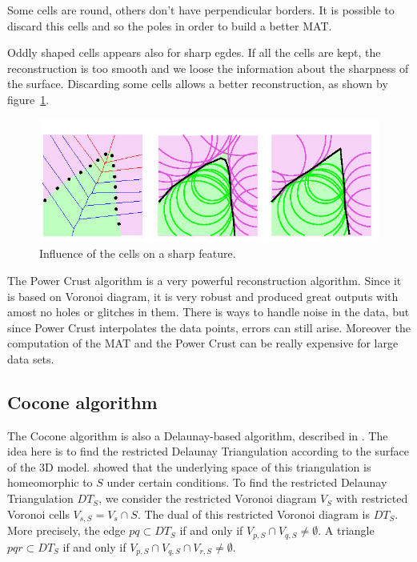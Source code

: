 \documentclass[12pt]{article}
\begin{document}
Some cells are round, others don't have perpendicular borders. It is possible to discard this cells and so the poles in order to build a better MAT. 

Oddly shaped cells appears also for sharp egdes. If all the cells are kept, the reconstruction is too smooth and we loose the information about the sharpness of the surface. Discarding some cells allows a better reconstruction, as shown by figure~\ref{sharpPC}.

\begin{figure}[h]
  \centering
  \includegraphics[scale=0.3]{sharpPC.jpg}
  \caption{\label{sharpPC} Influence of the cells on a sharp feature.}
\end{figure}

The Power Crust algorithm is a very powerful reconstruction algorithm. Since it is based on Voronoi diagram, it is very robust and produced great outputs with amost no holes or glitches in them. There is ways to handle noise in the data, but since Power Crust interpolates the data points, errors can still arise. Moreover the computation of the MAT and the Power Crust can be really expensive for large data sets.

\subsection{Cocone algorithm}
The Cocone algorithm is also a Delaunay-based algorithm, described in \cite{Cocone}. The idea here is to find the restricted Delaunay Triangulation according to the surface of the 3D model. \cite{homeo} showed that the underlying space of this triangulation is homeomorphic to $S$ under certain conditions. To find the restricted Delaunay Triangulation $DT_S$, we consider the restricted Voronoi diagram $V_S$ with restricted Voronoi cells $V_{s,S} = V_s\cap S$. The dual of this restricted Voronoi diagram is $DT_S$. More precisely, the edge $pq \subset DT_S$ if and only if $V_{p,S}\cap V_{q,S} \ne \emptyset$. A triangle $pqr \subset DT_S$ if and only if $V_{p,S}\cap V_{q,S}\cap V_{r,S} \ne \emptyset$.
\end{document}
